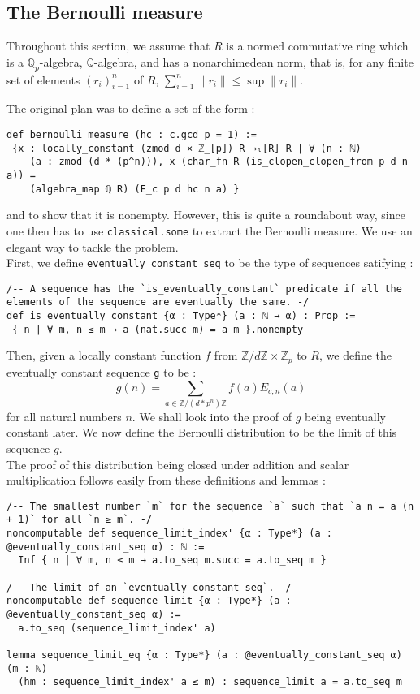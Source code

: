\documentclass[a4paper,UKenglish,cleveref, autoref, thm-restate]{lipics-v2021}
\newcommand{\lean}[1]{\texttt{#1}\xspace} %
\begin{document}
\subsection{The Bernoulli measure}
Throughout this section, we assume that $R$ is a normed commutative ring which is a $\mathbb{Q}_p$-algebra, 
$\mathbb{Q}$-algebra, and has a nonarchimedean norm, that is, for any finite set of elements 
$(r_i)_{i = 1}^n$ of $R$, $\sum_{i = 1}^n \parallel r_i \parallel \le \sup \parallel r_i \parallel$.

The original plan was to define a set of the form : 
\begin{lstlisting}
def bernoulli_measure (hc : c.gcd p = 1) :=
 {x : locally_constant (zmod d × ℤ_[p]) R →ₗ[R] R | ∀ (n : ℕ) 
    (a : zmod (d * (p^n))), x (char_fn R (is_clopen_clopen_from p d n a)) = 
    (algebra_map ℚ R) (E_c p d hc n a) }
\end{lstlisting}

and to show that it is nonempty. However, this is quite a roundabout way, since one then has to use 
\lean{classical.some} to extract the Bernoulli measure. We use an elegant way to tackle the problem. \\

First, we define \lean{eventually\_constant\_seq} to be the type of sequences satifying : 
\begin{lstlisting}
/-- A sequence has the `is_eventually_constant` predicate if all the elements of the sequence are eventually the same. -/
def is_eventually_constant {α : Type*} (a : ℕ → α) : Prop :=
 { n | ∀ m, n ≤ m → a (nat.succ m) = a m }.nonempty
\end{lstlisting}

Then, given a locally constant function $f$ from $\mathbb{Z}/d \mathbb{Z} \times \mathbb{Z}_p$ to $R$, 
we define the eventually constant sequence \lean{g} to be : 
$$ g(n) = \sum_{a \in \mathbb{Z}/(d*p^n) \mathbb{Z}} f(a) E_{c, n}(a) $$ 
for all natural numbers $n$. We shall look into the proof of $g$ being eventually constant later. We now define the Bernoulli 
distribution to be the limit of this sequence $g$. \\

The proof of this distribution being closed under addition and scalar multiplication follows easily from these definitions and lemmas : 
\begin{lstlisting}
/-- The smallest number `m` for the sequence `a` such that `a n = a (n + 1)` for all `n ≥ m`. -/
noncomputable def sequence_limit_index' {α : Type*} (a : @eventually_constant_seq α) : ℕ :=
  Inf { n | ∀ m, n ≤ m → a.to_seq m.succ = a.to_seq m }

/-- The limit of an `eventually_constant_seq`. -/
noncomputable def sequence_limit {α : Type*} (a : @eventually_constant_seq α) :=
  a.to_seq (sequence_limit_index' a)

lemma sequence_limit_eq {α : Type*} (a : @eventually_constant_seq α) (m : ℕ)
  (hm : sequence_limit_index' a ≤ m) : sequence_limit a = a.to_seq m
\end{lstlisting}
\end{document}

